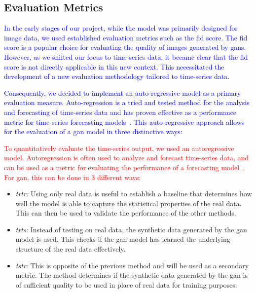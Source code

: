 \subsection{Evaluation Metrics}

\textcolor{blue}{In the early stages of our project, while the model was primarily designed for image data, we used established evaluation metrics such as the \gls*{fid} score. The \gls{fid} score is a popular choice for evaluating the quality of images generated by \glspl*{gan}. However, as we shifted our focus to time-series data, it became clear that the \gls{fid} score is not directly applicable in this new context. This necessitated the development of a new evaluation methodology tailored to time-series data.}

\textcolor{blue}{Consequently, we decided to implement an auto-regressive model as a primary evaluation measure. Auto-regression is a tried and tested method for the analysis and forecasting of time-series data and has proven effective as a performance metric for time-series forecasting models~\cite{rnntimeseries}. This auto-regressive approach allows for the evaluation of a \gls*{gan} model in three distinctive ways: \cite{esteban2017realvalued}}

\textcolor{red}{To quantitatively evaluate the time-series output, we used an autoregressive model. Autoregression is often used to analyze and forecast time-series data, and can be used as a metric for evaluating the performance of a forecasting model~\cite{rnntimeseries}. For \gls*{gan}, this can be done in 3 different ways:} %
\begin{itemize}
    \item \textit{\gls*{trtr}:} Using only real data is useful to establish a baseline that determines how well the model is able to capture the statistical properties of the real data. This can then be used to validate the performance of the other methods.
    \item \textit{\gls*{trts}:} Instead of testing on real data, the synthetic data generated by the 
    \gls*{gan} model is used. This checks if the \gls*{gan} model has learned the underlying structure of the real data effectively.
    \item \textit{\gls*{tstr}:} This is opposite of the previous method and will be used as a secondary metric. The method determines if the synthetic data generated by the \gls*{gan} is of sufficient quality to be used in place of real data for training purposes.
\end{itemize}



%
